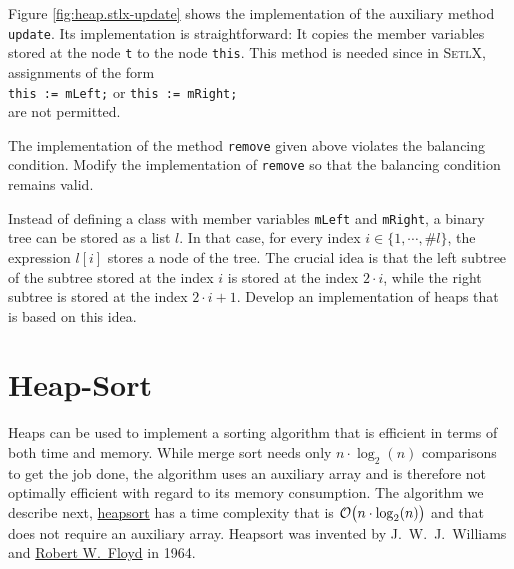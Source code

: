 \noindent 
Figure \ref{fig:heap.stlx-update} shows the implementation of the auxiliary method \texttt{update}.
Its implementation is straightforward: It copies the member variables stored at the node \texttt{t}
to the node \texttt{this}.  This method is needed since in \textsc{SetlX}, assignments of the form
\\[0.2cm]
\hspace*{1.3cm}
\texttt{this := mLeft;} \quad or \quad \texttt{this := mRight;}
\\[0.2cm]
are not permitted.


\exercise
The implementation of the method \texttt{remove} given above violates the balancing condition.
Modify the implementation of \texttt{remove} so that the balancing condition remains valid.

\exercise
Instead of defining a class with member variables \texttt{mLeft} and \texttt{mRight}, a binary tree
can be stored as a list $l$.  In that case, for every index $i \in \{1, \cdots, \mathtt{\#}l \}$,
the expression $l[i]$ stores a node of the tree.  The crucial idea is that the left subtree of the
subtree stored at the index $i$ is stored at the index $2 \cdot i$, while the right subtree is
stored at the index $2 \cdot i + 1$.  Develop an implementation of heaps that is based on this idea.

\section{Heap-Sort}
Heaps can be used to implement a sorting algorithm that is efficient in terms of both time and
memory. While merge sort needs only $n \cdot \log_2(n)$ comparisons to get the job done, the
algorithm uses an auxiliary array and is therefore not optimally efficient with regard to its memory
consumption.  The algorithm we describe next, \href{https://en.wikipedia.org/wiki/Heapsort}{heapsort} has
a time complexity that is $\mathcal{O}\bigl(n \cdot \log_2(n)\bigr)$ and that does not require an auxiliary
array.  Heapsort was invented by J.~W.~J.~Williams and
\href{https://en.wikipedia.org/wiki/Robert_W._Floyd}{Robert W.~Floyd} in 1964.

